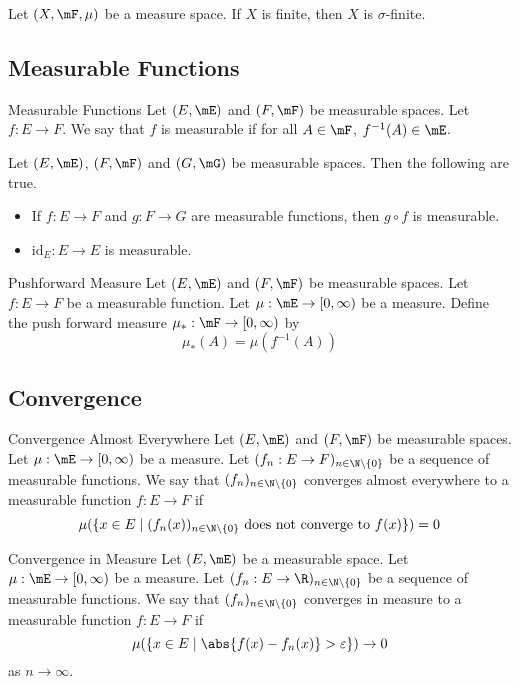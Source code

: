 \documentclass[a4paper]{article}
\begin{document}
\begin{lmm}{}{} Let $(X,\mF,\mu)$ be a measure space. If $X$ is finite, then $X$ is $\sigma$-finite. 
\end{lmm}

\subsection{Measurable Functions}
\begin{defn}{Measurable Functions}{} Let $(E,\mE)$ and $(F,\mF)$ be measurable spaces. Let $f:E\to F$. We say that $f$ is measurable if for all $A\in\mF$, $f^{-1}(A)\in\mE$. 
\end{defn}

\begin{lmm}{}{} Let $(E,\mE)$, $(F,\mF)$ and $(G,\mG)$ be measurable spaces. Then the following are true. 
\begin{itemize}
\item If $f:E\to F$ and $g:F\to G$ are measurable functions, then $g\circ f$ is measurable. 
\item $\text{id}_E:E\to E$ is measurable. 
\end{itemize}
\end{lmm}

\begin{defn}{Pushforward Measure}{} Let $(E,\mE)$ and $(F,\mF)$ be measurable spaces. Let $f:E\to F$ be a measurable function. Let $\mu:\mE\to[0,\infty)$ be a measure. Define the push forward measure $\mu_\ast:\mF\to[0,\infty)$ by $$\mu_\ast(A)=\mu(f^{-1}(A))$$
\end{defn}

\subsection{Convergence}
\begin{defn}{Convergence Almost Everywhere}{} Let $(E,\mE)$ and $(F,\mF)$ be measurable spaces. Let $\mu:\mE\to[0,\infty)$ be a measure. Let $(f_n:E\to F)_{n\in\N\setminus\{0\}}$ be a sequence of measurable functions. We say that $(f_n)_{n\in\N\setminus\{0\}}$ converges almost everywhere to a measurable function $f:E\to F$ if $$\mu(\{x\in E\;|\;(f_n(x))_{n\in\N\setminus\{0\}}\text{ does not converge to }f(x)\})=0$$
\end{defn}

\begin{defn}{Convergence in Measure}{} Let $(E,\mE)$ be a measurable space. Let $\mu:\mE\to[0,\infty)$ be a measure. Let $(f_n:E\to \R)_{n\in\N\setminus\{0\}}$ be a sequence of measurable functions. We say that $(f_n)_{n\in\N\setminus\{0\}}$ converges in measure to a measurable function $f:E\to F$ if $$\mu(\{x\in E\;|\;\abs{f(x)-f_n(x)}>\varepsilon\})\to0$$ as $n\to\infty$. 
\end{defn}
\end{document}

